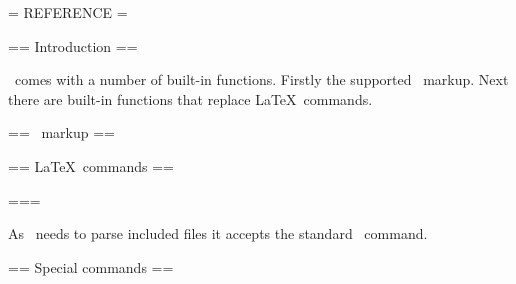 
= REFERENCE =

== Introduction ==

\wikitexer\ comes with a number of built-in functions. Firstly the
supported \mediawiki\ markup. Next there are built-in functions that
replace \LaTeX\ commands. 

== \mediawiki\ markup ==

== \LaTeX\ commands ==

=== 

As \wiktexer\ needs to parse included files it accepts the standard
\ command.

== Special commands ==
